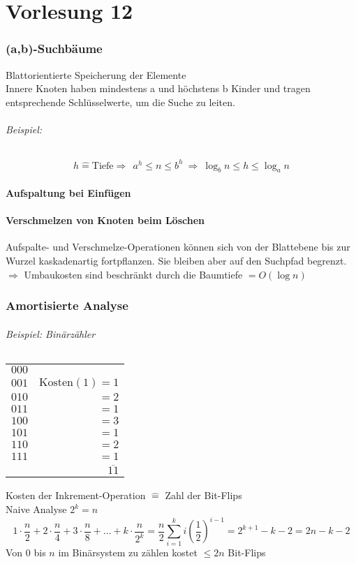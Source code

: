 \part{Vorlesung 12}
\section{(a,b)-Suchbäume}
Blattorientierte Speicherung der Elemente\\
Innere Knoten haben mindestens a und höchstens b Kinder und tragen entsprechende Schlüsselwerte, um die Suche zu leiten.
\paragraph{Beispiel:}%
\[h\hat{=}\text{Tiefe}\Rightarrow ~~ a^h\leq n \leq b^h ~\Rightarrow ~ \log_b n \leq h \leq \log_a n\]
\subsection{Aufspaltung bei Einfügen}
\subsection{Verschmelzen von Knoten beim Löschen}
Aufspalte- und Verschmelze-Operationen können sich von der Blattebene bis zur Wurzel kaskadenartig fortpflanzen. Sie bleiben aber auf den Suchpfad begrenzt.\\
$\Rightarrow$ Umbaukosten sind beschränkt durch die Baumtiefe $=O(\log n)$
\section{Amortisierte Analyse}
\paragraph{Beispiel: Binärzähler}
	\begin{tabular}{lr}
		$000$& \\
		$001$&$\text{Kosten}(1)=1$\\
		$010$&$=2$\\
		$011$&$=1$\\
		$100$&$=3$\\
		$101$&$=1$\\
		$110$&$=2$\\
		$111$&$=1$\\
		 &$\overline{11}$
	\end{tabular}
	Kosten der Inkrement-Operation $\hat{=}$ Zahl der Bit-Flips\\
	Naive Analyse $2^k=n$
	\[1\cdot\frac{n}{2}+2\cdot\frac{n}{4}+3\cdot\frac{n}{8}+\ldots+k\cdot\frac{n}{2^k}=\frac{n}{2}\sum_{i=1}^{k}i(\frac{1}{2})^{i-1}=2^{k+1}-k-2=2n-k-2 \]
Von $0$ bis $n$ im Binärsystem zu zählen kostet  $\leq 2n$ Bit-Flips
